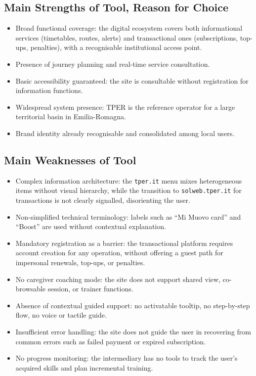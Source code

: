 ﻿\documentclass[11pt,a4paper]{article}
\begin{document}
\subsection*{Main Strengths of Tool, Reason for Choice}

\begin{itemize}
    \item Broad functional coverage: the digital ecosystem covers both
    informational services (timetables, routes, alerts) and
    transactional ones (subscriptions, top-ups, penalties), with a
    recognisable institutional access point.
    \item Presence of journey planning and real-time service consultation.
    \item Basic accessibility guaranteed: the site is consultable without registration for information functions.
    \item Widespread system presence: TPER is the reference operator for a large territorial basin in Emilia-Romagna.
    \item Brand identity already recognisable and consolidated among local users.
\end{itemize}

\subsection*{Main Weaknesses of Tool}

\begin{itemize}
    \item Complex information architecture: the
    \texttt{tper.it} menu mixes heterogeneous items without visual hierarchy,
    while the transition to \texttt{solweb.tper.it} for transactions
    is not clearly signalled, disorienting the user.
    \item Non-simplified technical terminology: labels such as
    ``Mi Muovo card'' and ``Boost'' are used without contextual
    explanation.
    \item Mandatory registration as a barrier: the transactional
    platform requires account creation for any
    operation, without offering a guest path for impersonal
    renewals, top-ups, or penalties.
    \item No caregiver coaching mode: the site does not support shared view, co-browsable session, or trainer functions.
    \item Absence of contextual guided support: no activatable tooltip, no step-by-step flow, no voice or tactile guide.
    \item Insufficient error handling: the site does not guide the user in recovering from common errors such as failed payment or expired subscription.
    \item No progress monitoring: the intermediary has no tools to track the user's acquired skills and plan incremental training.
\end{itemize}
\end{document}
